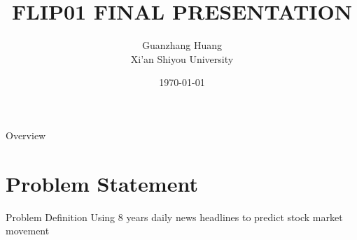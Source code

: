 \documentclass[
 size=12pt,
 paper=smartboard, %
 mode=present, %
 display=slides, %
style=tuliplab,
pauseslide,
fleqn,leqno]{powerdot}
\title{FLIP01 FINAL PRESENTATION}
\author{
Guanzhang Huang
\\
Xi'an Shiyou University 
}
\date{\today}
\begin{document}
\maketitle 
\begin{slide}[toc=,bm=]{Overview}
  \tableofcontents[content=sections]
\end{slide}

  \section{Problem Statement}

  \begin{slide}{Problem Definition}
 \hspace{0.5cm}  Using 8 years daily news headlines to predict stock market movement
  \end{slide}
\end{document}
